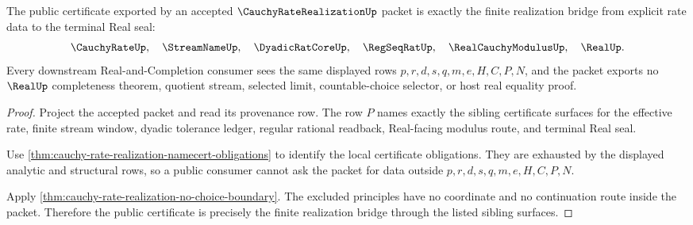 \begin{theorem}
\label{thm:cauchy-rate-realization-public-certificate}
The public certificate exported by an accepted $\CauchyRateRealizationUp$ packet is exactly the finite realization bridge from explicit rate data to the terminal Real seal:
$$
\CauchyRateUp,\quad \StreamNameUp,\quad \DyadicRatCoreUp,\quad \RegSeqRatUp,\quad \RealCauchyModulusUp,\quad \RealUp .
$$
Every downstream Real-and-Completion consumer sees the same displayed rows $p,r,d,s,q,m,e,H,C,P,N$, and the packet exports no $\RealUp$ completeness theorem, quotient stream, selected limit, countable-choice selector, or host real equality proof.
\end{theorem}
\begin{proof}
Project the accepted packet and read its provenance row. The row $P$ names exactly the sibling certificate surfaces for the effective rate, finite stream window, dyadic tolerance ledger, regular rational readback, Real-facing modulus route, and terminal Real seal.

Use \autoref{thm:cauchy-rate-realization-namecert-obligations} to identify the local certificate obligations. They are exhausted by the displayed analytic and structural rows, so a public consumer cannot ask the packet for data outside $p,r,d,s,q,m,e,H,C,P,N$.

Apply \autoref{thm:cauchy-rate-realization-no-choice-boundary}. The excluded principles have no coordinate and no continuation route inside the packet. Therefore the public certificate is precisely the finite realization bridge through the listed sibling surfaces.
\end{proof}


